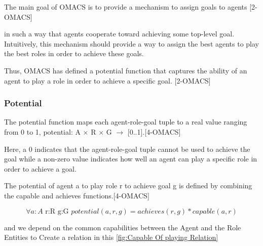 The main goal of OMACS is to provide a mechanism to assign goals to agents [2-OMACS]

in such a way that agents cooperate toward achieving some top-level goal.
Intuitively, this mechanism should provide a way to assign the best agents 
to play the best roles in order to achieve these goals. 



Thus, OMACS has defined  a potential function that captures the ability of an agent 
to play a role in order  to achieve a specific goal.   [2-OMACS]



\subsubsection{Potential}
The potential function maps each agent-role-goal tuple to a real value ranging from 0 to 1, 
potential: A $\times$ R $\times$ G $\rightarrow$ [0..1].[4-OMACS]

Here, a 0 indicates that the agent-role-goal tuple cannot be
used to achieve the goal while a non-zero value indicates how well an agent can play
a specific role in order to achieve a goal.  

The potential of agent a to play role r 
to achieve goal g is defined by combining the capable and achieves functions.[4-OMACS]

\begin{equation}
\forall a:A\textrm{ r:R g:G }potential(a,r,g)=achieves(r,g)*capable(a,r)\label{eq:potentialFunc}
\end{equation}

and we depend on the common capabilities between the Agent and the Role Entities to Create a relation in this \ref{fig:Capable Of playing Relation} 




